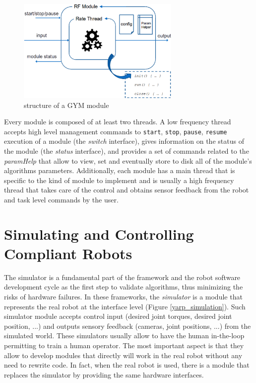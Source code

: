 \begin{figure}[!ht]
\centering
\includegraphics[width=0.7\textwidth]{images/GYM}
\caption{structure of a GYM module}
\label{gym}
\end{figure}

Every module is composed of at least two threads.
A low frequency thread accepts high level management commands to \texttt{start}, \texttt{stop}, \texttt{pause}, \texttt{resume} execution of a module (the \emph{switch} interface), gives information on the status of the module (the \emph{status} interface), and provides a set of commands related to the \emph{paramHelp} that allow to view, set and eventually store to disk all of the module's algorithms parameters. 
Additionally, each module has a main thread that is specific to the kind of module to implement and is usually a high frequency thread that takes care of the control and obtains sensor feedback from the robot and task level commands by the user.

\section{Simulating and Controlling Compliant Robots}
The simulator is a fundamental part of the framework and the robot software development cycle as the first step to validate algorithms, thus minimizing the risks of hardware failures.
In these frameworks, the \emph{simulator} is a module that represents the real robot at the interface level (Figure \ref{yarp_simulation}). Such simulator module accepts control input (desired joint torques, desired joint position, ...) and outputs sensory feedback (cameras, joint positions, ...) from the simulated world. These simulators usually allow to have the human in-the-loop permitting to train a human operator. The most important aspect is that they allow to develop modules that directly will work in the real robot without any need to rewrite code. In fact, when the real robot is used, there is a module that replaces the simulator by providing the same hardware interfaces. 

